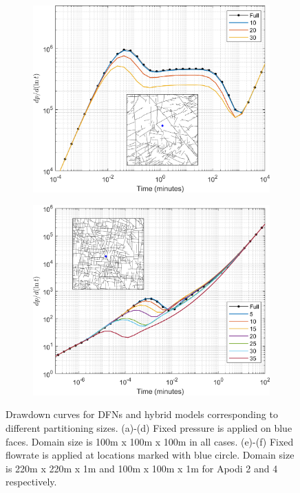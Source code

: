 \documentclass[main.tex]{subfiles}
\begin{document}
\begin{figure}[ht]
\begin{subfigure}{0.3\textwidth}
			\label{fig:DD_D}
		\end{subfigure}
		\begin{subfigure}{0.3\textwidth}
			\includegraphics[width=\textwidth]{DD_main/Apodi2_matwell_BCinset.png}
			\label{fig:DD_A2}
		\end{subfigure}
		\begin{subfigure}{0.3\textwidth}
			\includegraphics[width=\textwidth]{DD_main/Apodi4_fracwell_BCinset.png}
			\label{fig:DD_A4}
		\end{subfigure}
		\caption{Drawdown curves for DFNs and hybrid models corresponding to different partitioning sizes. (a)-(d) Fixed pressure is applied on blue faces. Domain size is 100m x 100m x 100m in all cases. (e)-(f) Fixed flowrate is applied at locations marked with blue circle. Domain size is 220m x 220m x 1m and 100m x 100m x 1m for Apodi 2 and 4 respectively.}
		\label{fig:DD}
	\end{figure}
	
	
	
\end{document}
